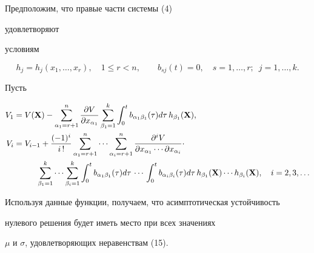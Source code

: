 \begin{exam} Предположим, что правые части системы (4) 


удовлетворяют 


условиям 


$$ 


h_j=h_j(x_1,\dotsc,x_r),\quad 1\le r<n,\qquad 


b_{sj}(t)=0,\quad s=1,\dotsc,r;\ \; j=1,\dotsc,k. 


$$ 


 


Пусть 


\begin{align*} 


V_1&=V(\bx)-\sum^n_{\alpha_1=r+1} 


\frac{\partial V}{\partial x_{\alpha_1}}\sum^k_{\beta_1=1} 


\int^t_0 b_{\alpha_1\beta_1}(\tau)d\tau\,h_{\beta_1}(\bx),\\ 


V_i&=V_{i-1}+\frac{(-1)^i}{i\,!}\sum^n_{\alpha_1=r+1}\dotsb 


\sum^n_{\alpha_i=r+1} 


\frac{\partial^i V}{\partial x_{\alpha_1}\dotsb 


\partial x_{\alpha_i}} \cdot\\ 


&\phantom{=}\qquad \sum^k_{\beta_1=1}\dotsb\sum^k_{\beta_i=1} 


\int^t_0 b_{\alpha_1\beta_1}(\tau)d\tau\,\dotsb\, 


\int^t_0 b_{\alpha_i\beta_i}(\tau)d\tau\, 


h_{\beta_1}(\bx)\dotsb h_{\beta_i}(\bx),\quad i=2,3,\dotsc 


\end{align*} 


Используя данные функции, получаем, что асимптотическая устойчивость 


нулевого решения будет иметь место при всех значениях 


$\mu$ и $\sigma$, удовлетворяющих неравенствам (15). 


\end{exam} 


 


